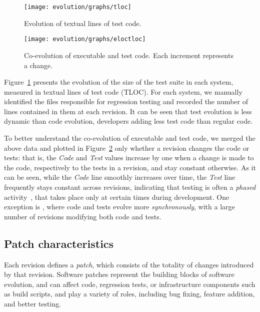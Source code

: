 \begin{figure}[t]
\centering
\texttt{[image: evolution/graphs/tloc]}
\caption{Evolution of textual lines of test code.}
\label{fig:tloc-evol}
\end{figure}


\begin{figure}[t]
\centering
\texttt{[image: evolution/graphs/eloctloc]}
\caption{Co-evolution of executable and test code. Each increment represents a change.}
\label{fig:coeloctloc}
\end{figure}


Figure~\ref{fig:tloc-evol} presents the evolution of the size of the
test suite in each system, measured in textual lines of test code
(TLOC).  For each system, we manually identified the files responsible
for regression testing and recorded the number of lines contained in
them at each revision. It can be seen that test evolution is less
dynamic than code evolution, developers adding less test code than
regular code.


To better understand the co-evolution of executable and test code, we
merged the above data and plotted in Figure~\ref{fig:coeloctloc}
only whether a revision changes the code or tests: that is,
the \emph{Code} and \emph{Test} values increase by one when a change is
made to the code, respectively to the tests in a revision, and stay constant
otherwise.  As it can be seen, while the \emph{Code} line smoothly
increases over time, the \emph{Test} line frequently stays constant
across revisions, indicating that testing is often a \textit{phased}
activity~\cite{coevol:emse11}, that takes place only at certain times
during development. One exception is \git, where code and
tests evolve more \textit{synchronously}, with a large number of
revisions modifying both code and tests.

\subsection{Patch characteristics}


Each revision defines a \textit{patch}, which consists of the totality
of changes introduced by that revision.  Software patches represent
the building blocks of software evolution, and 
can affect code, regression tests, or infrastructure components such
as build scripts, and play a variety of roles, including bug fixing,
feature addition, and better testing.  

